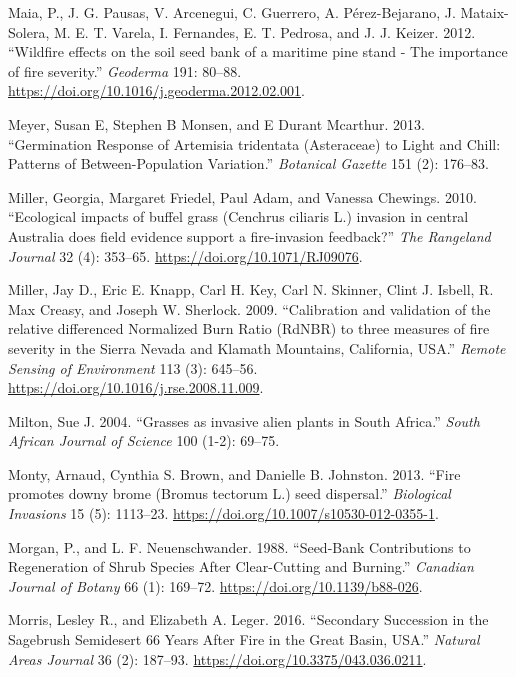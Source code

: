 \documentclass[
  12pt,
]{article}
\newlength{\cslhangindent}
\newlength{\cslentryspacingunit} %
\newenvironment{CSLReferences}[2] %
 {%
  \setlength{\parindent}{0pt}
  \ifodd #1
  \let\oldpar\par
  \def\par{\hangindent=\cslhangindent\oldpar}
  \fi
  \setlength{\parskip}{#2\cslentryspacingunit}
 }%
 {}
\begin{document}
\begin{CSLReferences}{1}{0}
\leavevmode{}%
Maia, P., J. G. Pausas, V. Arcenegui, C. Guerrero, A. Pérez-Bejarano, J.
Mataix-Solera, M. E. T. Varela, I. Fernandes, E. T. Pedrosa, and J. J.
Keizer. 2012. {``{Wildfire effects on the soil seed bank of a maritime
pine stand - The importance of fire severity}.''} \emph{Geoderma} 191:
80--88. \url{https://doi.org/10.1016/j.geoderma.2012.02.001}.

\leavevmode{}%
Meyer, Susan E, Stephen B Monsen, and E Durant Mcarthur. 2013.
{``{Germination Response of Artemisia tridentata (Asteraceae) to Light
and Chill: Patterns of Between-Population Variation}.''} \emph{Botanical
Gazette} 151 (2): 176--83.

\leavevmode{}%
Miller, Georgia, Margaret Friedel, Paul Adam, and Vanessa Chewings.
2010. {``{Ecological impacts of buffel grass (Cenchrus ciliaris L.)
invasion in central Australia does field evidence support a
fire-invasion feedback?}''} \emph{The Rangeland Journal} 32 (4):
353--65. \url{https://doi.org/10.1071/RJ09076}.

\leavevmode{}%
Miller, Jay D., Eric E. Knapp, Carl H. Key, Carl N. Skinner, Clint J.
Isbell, R. Max Creasy, and Joseph W. Sherlock. 2009. {``{Calibration and
validation of the relative differenced Normalized Burn Ratio (RdNBR) to
three measures of fire severity in the Sierra Nevada and Klamath
Mountains, California, USA}.''} \emph{Remote Sensing of Environment} 113
(3): 645--56. \url{https://doi.org/10.1016/j.rse.2008.11.009}.

\leavevmode{}%
Milton, Sue J. 2004. {``{Grasses as invasive alien plants in South
Africa}.''} \emph{South African Journal of Science} 100 (1-2): 69--75.

\leavevmode{}%
Monty, Arnaud, Cynthia S. Brown, and Danielle B. Johnston. 2013.
{``{Fire promotes downy brome (Bromus tectorum L.) seed dispersal}.''}
\emph{Biological Invasions} 15 (5): 1113--23.
\url{https://doi.org/10.1007/s10530-012-0355-1}.

\leavevmode{}%
Morgan, P., and L. F. Neuenschwander. 1988. {``Seed-Bank Contributions
to Regeneration of Shrub Species After Clear-Cutting and Burning.''}
\emph{Canadian Journal of Botany} 66 (1): 169--72.
\url{https://doi.org/10.1139/b88-026}.

\leavevmode{}%
Morris, Lesley R., and Elizabeth A. Leger. 2016. {``Secondary
{Succession} in the {Sagebrush} {Semidesert} 66 {Years} {After} {Fire}
in the {Great} {Basin}, {USA}.''} \emph{Natural Areas Journal} 36 (2):
187--93. \url{https://doi.org/10.3375/043.036.0211}.


\end{CSLReferences}
\end{document}
